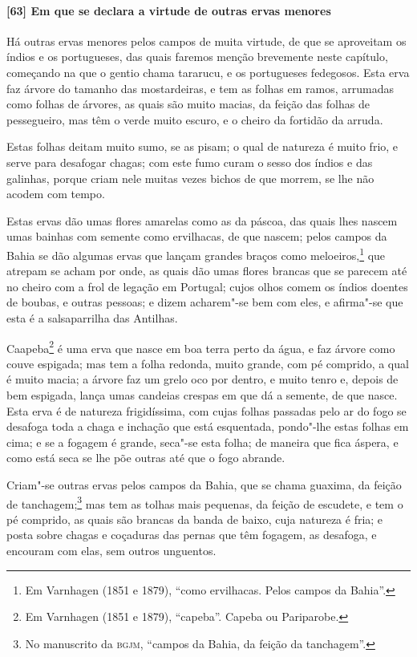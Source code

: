 \begin{linenumbers}
\paragraph{[63] Em que se declara a virtude de outras ervas menores}\quad
Há outras ervas menores pelos campos de muita virtude, de que se aproveitam os índios e os
portugueses, das quais faremos menção brevemente neste capítulo, começando na que o gentio
chama tararucu, e os portugueses fedegosos. Esta erva faz árvore do tamanho das
mostardeiras, e tem as folhas em ramos, arrumadas como folhas de árvores, as quais são
muito macias, da feição das folhas de pessegueiro, mas têm o verde muito escuro, e o
cheiro da fortidão da arruda.

Estas folhas deitam muito sumo, se as pisam; o qual de natureza é muito frio, e serve para
desafogar chagas; com este fumo curam o sesso dos índios e das galinhas, porque criam nele
muitas vezes bichos de que morrem, se lhe não acodem com tempo.

Estas ervas dão umas flores amarelas como as da páscoa, das quais lhes nascem umas bainhas
com semente como ervilhacas, de que nascem; pelos campos da Bahia se dão algumas ervas que
lançam grandes braços como meloeiros,\footnote{ Em Varnhagen (1851 e 1879), ``como
ervilhacas. Pelos campos da Bahia''.} que atrepam se acham por onde, as quais dão umas
flores brancas que se parecem até no cheiro com a frol de legação em Portugal; cujos olhos
comem os índios doentes de boubas, e outras pessoas; e dizem acharem"-se bem com eles, e
afirma"-se que esta é a salsaparrilha das Antilhas.

Caapeba\footnote{ Em Varnhagen (1851 e 1879), ``capeba''. Capeba ou Pariparobe.} é uma
erva que nasce em boa terra perto da água, e faz árvore como couve espigada; mas tem a
folha redonda, muito grande, com pé comprido, a qual é muito macia; a árvore faz um grelo
oco por dentro, e muito tenro e, depois de bem espigada, lança umas candeias crespas em
que dá a semente, de que nasce. Esta erva é de natureza frigidíssima, com cujas folhas
passadas pelo ar do fogo se desafoga toda a chaga e inchação que está esquentada,
pondo"-lhe estas folhas em cima; e se a fogagem é grande, seca"-se esta folha; de maneira
que fica áspera, e como está seca se lhe põe outras até que o fogo abrande.

Criam"-se outras ervas pelos campos da Bahia, que se chama guaxima, da feição de
tanchagem;\footnote{ No manuscrito da \textsc{bgjm}, ``campos da Bahia, da feição da
tanchagem''.} mas tem as tolhas mais pequenas, da feição de escudete, e tem o pé comprido,
as quais são brancas da banda de baixo, cuja natureza é fria; e posta sobre chagas e
coçaduras das pernas que têm fogagem, as desafoga, e encouram com elas, sem outros
unguentos.


\end{linenumbers}
